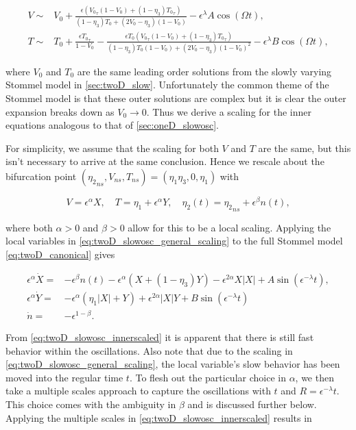 \begin{equation}\label{eq:twoD_slowosc_outersoln}
\begin{aligned}
V\sim& V_0 + \frac{\epsilon({V_0}_\tau(1-V_0)+(1-\eta_3){T_0}_\tau)}{(1-\eta_3)T_0+(2V_0-\eta_3)(1-V_0)}-\epsilon^\lambda A \cos(\Omega t),\\
T\sim& T_0 + \frac{\epsilon {T_0}_\tau}{1-V_0}-\frac{\epsilon T_0({V_0}_\tau(1-V_0)+(1-\eta_3){T_0}_\tau)}{(1-\eta_3)T_0(1-V_0)+(2V_0-\eta_3)(1-V_0)^2}-\epsilon^\lambda B \cos(\Omega t),
\end{aligned}
\end{equation}

where $V_0$ and $T_0$ are the same leading order solutions from the slowly varying Stommel model in \autoref{sec:twoD_slow}. Unfortunately the common theme of the Stommel model is that these outer solutions are complex but it is clear the outer expansion breaks down as $V_0\to 0$. Thus we derive a scaling for the inner equations analogous to that of \autoref{sec:oneD_slowosc}.

For simplicity, we assume that the scaling for both $V$ and $T$ are the same, but this isn't necessary to arrive at the same conclusion. Hence we rescale about the bifurcation point $({\eta_2}_{ns},V_{ns},T_{ns})=(\eta_1\eta_3,0,\eta_1)$ with

\begin{equation}\label{eq:twoD_slowosc_general_scaling}
V=\epsilon^\alpha X, \quad T=\eta_1+\epsilon^\alpha Y ,\quad \eta_2(t)={\eta_2}_{ns}+\epsilon^\beta n(t),
\end{equation}

where both $\alpha>0$ and $\beta>0$ allow for this to be a local scaling. Applying the local variables in \eqref{eq:twoD_slowosc_general_scaling} to the full Stommel model \eqref{eq:twoD_canonical} gives

\begin{equation}\label{eq:twoD_slowosc_innerscaled}
\begin{aligned}
\epsilon^\alpha \dot{X}=& -\epsilon^\beta n(t)-\epsilon^\alpha (X+(1-\eta_3)Y) - \epsilon^{2\alpha}X|X| +A\sin(\epsilon^{-\lambda}t),\\
\epsilon^\alpha \dot{Y}=&-\epsilon^\alpha(\eta_1|X|+Y)+\epsilon^{2\alpha}|X|Y +B\sin(\epsilon^{-\lambda} t)\\
\dot{n}=&-\epsilon^{1-\beta}.
\end{aligned}
\end{equation}

From \eqref{eq:twoD_slowosc_innerscaled} it is apparent that there is still fast behavior within the oscillations. Also note that due to the scaling in \eqref{eq:twoD_slowosc_general_scaling}, the local variable's slow behavior has been moved into the regular time $t$. To flesh out the particular choice in $\alpha$, we then take a multiple scales approach to capture the oscillations with $t$ and $R=\epsilon^{-\lambda}t$. This choice comes with the ambiguity in $\beta$ and is discussed further below. Applying the multiple scales in \eqref{eq:twoD_slowosc_innerscaled} results in

